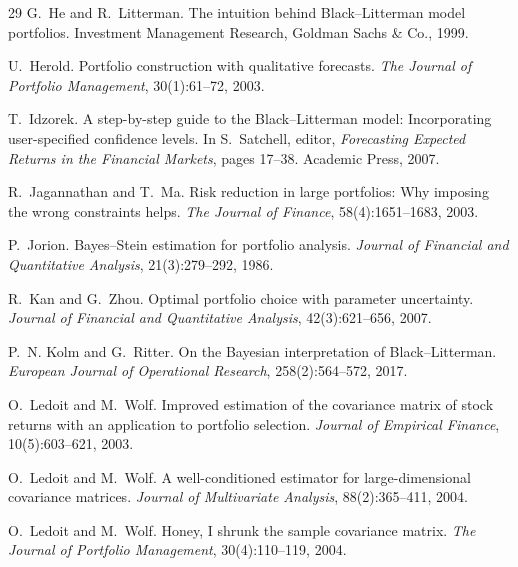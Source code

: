 \documentclass[a4paper,11pt]{article}
\theoremstyle{plain}
\theoremstyle{definition}
\begin{document}
\begin{thebibliography}{29}
G.~He and R.~Litterman.
\newblock The intuition behind Black--Litterman model portfolios.
\newblock Investment Management Research, Goldman Sachs \& Co., 1999.

U.~Herold.
\newblock Portfolio construction with qualitative forecasts.
\newblock \emph{The Journal of Portfolio Management}, 30(1):61--72, 2003.

T.~Idzorek.
\newblock A step-by-step guide to the Black--Litterman model:
Incorporating user-specified confidence levels.
\newblock In S.~Satchell, editor, \emph{Forecasting Expected Returns in
the Financial Markets}, pages 17--38. Academic Press, 2007.

R.~Jagannathan and T.~Ma.
\newblock Risk reduction in large portfolios: Why imposing the wrong
constraints helps.
\newblock \emph{The Journal of Finance}, 58(4):1651--1683, 2003.

P.~Jorion.
\newblock Bayes--Stein estimation for portfolio analysis.
\newblock \emph{Journal of Financial and Quantitative Analysis},
21(3):279--292, 1986.

R.~Kan and G.~Zhou.
\newblock Optimal portfolio choice with parameter uncertainty.
\newblock \emph{Journal of Financial and Quantitative Analysis},
42(3):621--656, 2007.

P.~N. Kolm and G.~Ritter.
\newblock On the Bayesian interpretation of Black--Litterman.
\newblock \emph{European Journal of Operational Research},
258(2):564--572, 2017.

O.~Ledoit and M.~Wolf.
\newblock Improved estimation of the covariance matrix of stock returns
with an application to portfolio selection.
\newblock \emph{Journal of Empirical Finance}, 10(5):603--621, 2003.

O.~Ledoit and M.~Wolf.
\newblock A well-conditioned estimator for large-dimensional covariance
matrices.
\newblock \emph{Journal of Multivariate Analysis}, 88(2):365--411,
2004{}.

O.~Ledoit and M.~Wolf.
\newblock Honey, I shrunk the sample covariance matrix.
\newblock \emph{The Journal of Portfolio Management}, 30(4):110--119,
2004{}.


\end{thebibliography}
\end{document}
